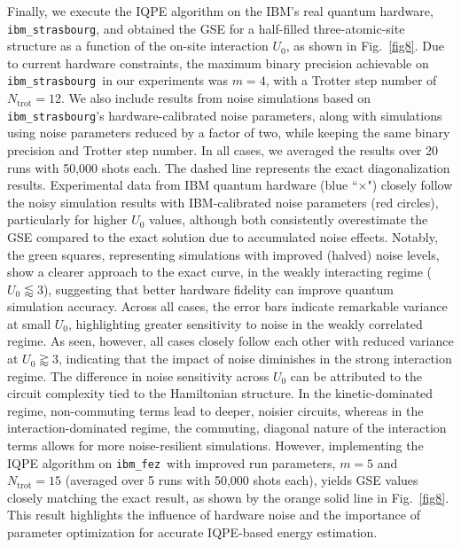 \documentclass[twocolumn,superscriptaddress,amsmath,amssymb,showpacs,floatfix,preprintnumbers]{revtex4-1}
\newcommand{\ibmstr}{\texttt{ibm\_strasbourg}}
\newcommand{\ibmfez}{\texttt{ibm\_fez}}
\begin{document}
Finally, we execute the IQPE algorithm on the IBM's real quantum hardware, \ibmstr, and obtained the GSE for
a half-filled three-atomic-site structure as a function of the on-site interaction $U_0$, as shown in
Fig.~\ref{fig8}.
%
Due to current hardware constraints, the maximum binary precision achievable on \ibmstr\ in our experiments was $m = 4$, with a Trotter step number of $N_\mathrm{trot} = 12$.
%
We also include results from noise simulations based on \ibmstr's hardware-calibrated noise parameters, 
along with simulations using noise parameters reduced by a factor of two, while keeping the same 
binary precision and Trotter step number.
%
In all cases, we averaged the results over 20 runs with 50,000 shots each.  
%
The dashed line represents the exact diagonalization results.
%
Experimental data from IBM quantum hardware (blue ``$\times$") closely follow the noisy simulation results
with IBM-calibrated noise parameters (red circles), particularly for higher $U_0$ values, although 
both consistently overestimate the GSE compared to the exact solution due to accumulated noise effects. 
%
Notably, the green squares, representing simulations with improved (halved) noise levels, show a 
clearer approach to the exact curve, in the weakly interacting regime ($U_0 \lessapprox 3$), 
suggesting that better hardware fidelity can improve quantum simulation accuracy.
%
Across all cases, the error bars indicate remarkable variance at small $U_0$, highlighting greater
sensitivity to noise in the weakly correlated regime.
%
As seen, however, all cases closely follow each other with reduced variance at $U_0 \gtrapprox 3$,
indicating that the impact of noise diminishes in the strong interaction regime.
%
The difference in noise sensitivity across $U_0$ can be attributed to the circuit complexity tied 
to the Hamiltonian structure. 
%
In the kinetic-dominated regime, non-commuting terms lead to deeper, 
noisier circuits, whereas in the interaction-dominated regime, the commuting, diagonal nature 
of the interaction terms allows for more noise-resilient simulations.
%
However, implementing the IQPE algorithm on \ibmfez\ with improved run parameters, $m = 5$ and $N_\mathrm{trot} = 15$ (averaged over 5 runs with 50,000 shots each), yields GSE values closely matching the exact result, as shown by the orange solid line in Fig.~\ref{fig8}.
This result highlights the influence of hardware noise and the importance of parameter optimization for accurate IQPE-based energy estimation.

\end{document}
